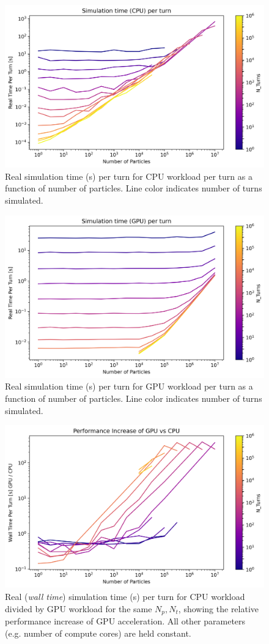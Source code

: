 \documentclass[11pt]{report}
\begin{document}
\begin{figure}
  \centering
  \includegraphics*[width=0.8\linewidth]{CPU_graph_per_turn.png}
  \caption{Real simulation time (s) per turn for CPU workload per turn as a function of number of particles. Line color indicates number of turns simulated.}\label{fig:cpu_graph_per_turn}
\end{figure}

\begin{figure}[h]
  \centering
  \includegraphics*[width=0.8\linewidth]{GPU_graph_per_turn.png}
  \caption{Real simulation time (s) per turn for GPU workload per turn as a function of number of particles. Line color indicates number of turns simulated.}\label{fig:gpu_graph_per_turn}
\end{figure}


\begin{figure}
  \centering
  \includegraphics*[width=0.8\linewidth]{COMPARISON_graph_per_turn.png}
  \cprotect\caption{Real (\textit{wall time}) simulation time (s) per turn for CPU workload divided by GPU workload for the same $N_p, N_t$, showing the relative performance increase of GPU acceleration. All other parameters (e.g. number of compute cores) are held constant.}\label{fig:comparison_graph_per_turn}
\end{figure}
\end{document}
